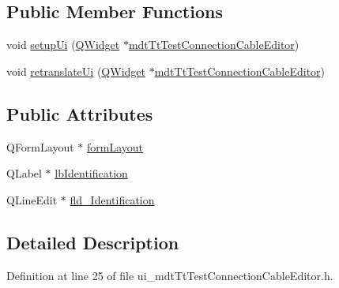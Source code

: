 \subsection*{Public Member Functions}
\begin{DoxyCompactItemize}
\item 
void \hyperlink{class_ui__mdt_tt_test_connection_cable_editor_a919a7fd9d845da19bb875790d324e2bd}{setup\-Ui} (\hyperlink{class_q_widget}{Q\-Widget} $\ast$\hyperlink{classmdt_tt_test_connection_cable_editor}{mdt\-Tt\-Test\-Connection\-Cable\-Editor})
\item 
void \hyperlink{class_ui__mdt_tt_test_connection_cable_editor_afbb3841480fb99cb768993de93696ece}{retranslate\-Ui} (\hyperlink{class_q_widget}{Q\-Widget} $\ast$\hyperlink{classmdt_tt_test_connection_cable_editor}{mdt\-Tt\-Test\-Connection\-Cable\-Editor})
\end{DoxyCompactItemize}
\subsection*{Public Attributes}
\begin{DoxyCompactItemize}
\item 
Q\-Form\-Layout $\ast$ \hyperlink{class_ui__mdt_tt_test_connection_cable_editor_a982dc6b55ea260618506bae6016829b4}{form\-Layout}
\item 
Q\-Label $\ast$ \hyperlink{class_ui__mdt_tt_test_connection_cable_editor_a5ac4572eb43535d5db317a022887a33c}{lb\-Identification}
\item 
Q\-Line\-Edit $\ast$ \hyperlink{class_ui__mdt_tt_test_connection_cable_editor_a3c64a6ce2c1c3daa4ddcea32767daa1c}{fld\-\_\-\-Identification}
\end{DoxyCompactItemize}


\subsection{Detailed Description}


Definition at line 25 of file ui\-\_\-mdt\-Tt\-Test\-Connection\-Cable\-Editor.\-h.



